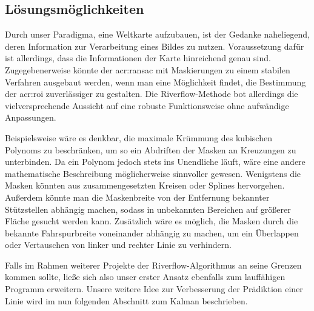 \subsection{Lösungsmöglichkeiten}

Durch unser Paradigma, eine Weltkarte aufzubauen, ist der Gedanke naheliegend, deren Information zur Verarbeitung eines Bildes zu nutzen. Voraussetzung dafür ist allerdings, dass die Informationen der Karte hinreichend genau sind. Zugegebenerweise könnte der \gls{acr:ransac} mit Maskierungen zu einem stabilen Verfahren ausgebaut werden, wenn man eine Möglichkeit findet, die Bestimmung der \gls{acr:roi} zuverlässiger zu gestalten. Die Riverflow-Methode bot allerdings die vielversprechende Aussicht auf eine robuste Funktionsweise ohne aufwändige Anpassungen. 

Beispielsweise wäre es denkbar, die maximale Krümmung des kubischen Polynoms zu beschränken, um so ein Abdriften der Masken an Kreuzungen zu unterbinden. Da ein Polynom jedoch stets ins Unendliche läuft, wäre eine andere mathematische Beschreibung möglicherweise sinnvoller gewesen. Wenigstens die Masken könnten aus zusammengesetzten Kreisen oder Splines hervorgehen. Außerdem könnte man die Maskenbreite von der Entfernung bekannter Stützstellen abhängig machen, sodass in unbekannten Bereichen auf größerer Fläche gesucht werden kann. Zusätzlich wäre es möglich, die Masken durch die bekannte Fahrspurbreite voneinander abhängig zu machen, um ein Überlappen oder Vertauschen von linker und rechter Linie zu verhindern.

Falls im Rahmen weiterer Projekte der Riverflow-Algorithmus an seine Grenzen kommen sollte, ließe sich also unser erster Ansatz ebenfalls zum lauffähigen Programm erweitern. Unsere weitere Idee zur Verbesserung der Prädiktion einer Linie wird im nun folgenden Abschnitt zum Kalman beschrieben.

